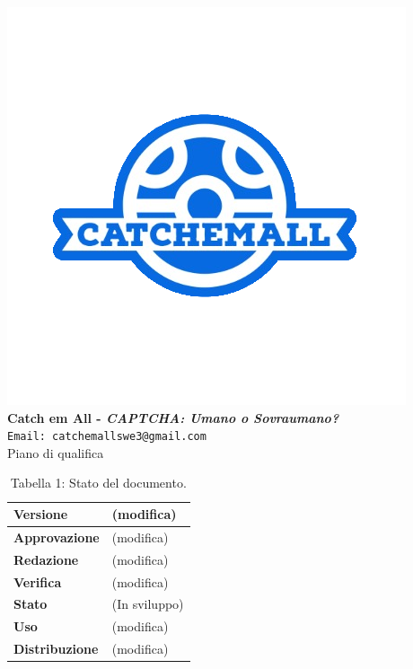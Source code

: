 \begin{titlepage}
\begin{center}
	\includegraphics[scale = 1.5]{img/logo.png}\\
	\bigskip
	\large \textbf{Catch em All - \textit{CAPTCHA: Umano o Sovraumano?}}\\
	\texttt{Email: catchemallswe3@gmail.com}\\
	\vfill
	{\fontsize{1.5cm}{0}\selectfont Piano di qualifica}\\
	\vfill
	\begin{table}[h]
		\centering
		\setlength\extrarowheight{4pt}
		\begin{tabular}{| C{4.5cm} | C{4.5cm} |}
			\hline
			\textbf{Versione} & (modifica)\\
			\hline
			\textbf{Approvazione} & (modifica)\\
			\hline
			\textbf{Redazione} & (modifica)\\
			\hline
			\textbf{Verifica} & (modifica)\\
			\hline
			\textbf{Stato} & (In sviluppo)\\
			\hline
			\textbf{Uso} & (modifica)\\
			\hline
			\textbf{Distribuzione} & (modifica)\\
			\hline
		\end{tabular}\\
		\caption{Tabella 1: Stato del documento.}
	\end{table}
	
\end{center}
\end{titlepage}